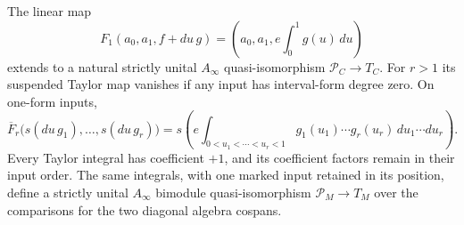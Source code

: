 \begin{theorem}\label{ogd:thm:dg-path-chamber}
The linear map
\[
 F_1(a_0,a_1,f+du\,g)
       =(a_0,a_1,e\!\int_0^1g(u)\,du)
\]
extends to a natural strictly unital \(A_\infty\) quasi-isomorphism
\(\mathcal P_C\to T_C\). For \(r>1\) its suspended Taylor map
vanishes if any input has interval-form degree zero. On one-form inputs,
\begin{equation}\label{ogd:eq:dg-iterated-integrals}
 \overline F_r\bigl(s(du\,g_1),\ldots,s(du\,g_r)\bigr)
 =s\left(e\int_{0<u_1<\cdots<u_r<1}
           g_1(u_1)\cdots g_r(u_r)\,du_1\cdots du_r\right).
\end{equation}
Every Taylor integral has coefficient \(+1\), and its coefficient
factors remain in their input order. The same integrals, with one
marked input retained in its position, define a strictly unital
\(A_\infty\) bimodule quasi-isomorphism \(\mathcal P_M\to T_M\)
over the comparisons for the two diagonal algebra cospans.
\end{theorem}

